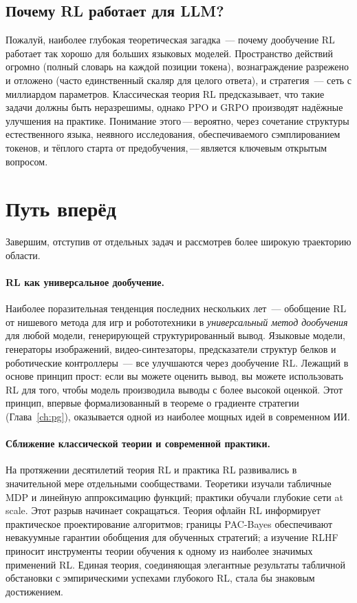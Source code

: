 \subsection{Почему RL работает для LLM?}

Пожалуй, наиболее глубокая теоретическая загадка~--- почему дообучение RL работает
так хорошо для больших языковых моделей. Пространство действий огромно
(полный словарь на каждой позиции токена), вознаграждение
разрежено и отложено (часто единственный скаляр для целого ответа), и
стратегия~--- сеть с миллиардом параметров. Классическая теория RL
предсказывает, что такие задачи должны быть неразрешимы, однако PPO и GRPO
производят надёжные улучшения на практике. Понимание
этого\,---\,вероятно, через сочетание структуры естественного
языка, неявного исследования, обеспечиваемого сэмплированием токенов, и
тёплого старта от предобучения,\,---\,является ключевым открытым вопросом.


\section{Путь вперёд}
\label{sec:open-road}

Завершим, отступив от отдельных задач и рассмотрев
более широкую траекторию области.

\paragraph{RL как универсальное дообучение.}
Наиболее поразительная тенденция последних нескольких лет~--- обобщение RL
от нишевого метода для игр и робототехники
в \emph{универсальный метод дообучения} для любой модели, генерирующей
структурированный вывод. Языковые модели, генераторы изображений, видео-синтезаторы,
предсказатели структур белков и роботические контроллеры~---
все улучшаются через дообучение RL. Лежащий в основе
принцип прост: если вы можете оценить вывод, вы можете использовать RL для
того, чтобы модель производила выводы с более высокой оценкой. Этот принцип, впервые
формализованный в теореме о градиенте стратегии (Глава~\ref{ch:pg}),
оказывается одной из наиболее мощных идей в современном ИИ.

\paragraph{Сближение классической теории и современной практики.}
На протяжении десятилетий теория RL и практика RL развивались в
значительной мере отдельными сообществами. Теоретики изучали табличные MDP и линейную аппроксимацию
функций; практики обучали глубокие сети at scale.
Этот разрыв начинает сокращаться. Теория офлайн RL информирует практическое
проектирование алгоритмов; границы PAC-Bayes обеспечивают невакуумные гарантии обобщения
для обученных стратегий; а изучение RLHF приносит
инструменты теории обучения к одному из наиболее значимых
применений RL. Единая теория, соединяющая элегантные
результаты табличной обстановки с эмпирическими успехами глубокого RL,
стала бы знаковым достижением.

